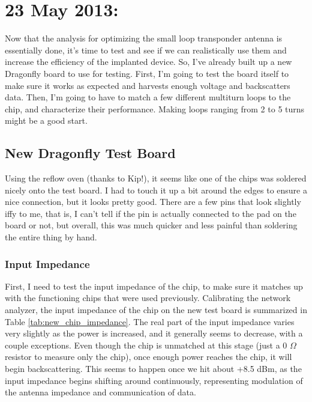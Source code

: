 \documentclass[12pt,onecolumn,titlepage]{article}
\begin{document}
\clearpage
\section{23 May 2013:}

\indent \indent Now that the analysis for optimizing the small loop transponder antenna is essentially done, it's time to test and see if we can realistically use them and increase the efficiency of the implanted device. So, I've already built up a new Dragonfly board to use for testing. First, I'm going to test the board itself to make sure it works as expected and harvests enough voltage and backscatters data. Then, I'm going to have to match a few different multiturn loops to the chip, and characterize their performance. Making loops ranging from 2 to 5 turns might be a good start.

\subsection{New Dragonfly Test Board}
\indent \indent Using the reflow oven (thanks to Kip!), it seems like one of the chips was soldered nicely onto the test board. I had to touch it up a bit around the edges to ensure a nice connection, but it looks pretty good. There are a few pins that look slightly iffy to me, that is, I can't tell if the pin is actually connected to the pad on the board or not, but overall, this was much quicker and less painful than soldering the entire thing by hand. 


\subsubsection{Input Impedance}
\indent \indent First, I need to test the input impedance of the chip, to make sure it matches up with the functioning chips that were used previously. Calibrating the network analyzer, the input impedance of the chip on the new test board is summarized in Table \ref{tab:new_chip_impedance}. The real part of the input impedance varies very slightly as the power is increased, and it generally seems to decrease, with a couple exceptions. Even though the chip is unmatched at this stage (just a 0 $\Omega$ resistor to measure only the chip), once enough power reaches the chip, it will begin backscattering. This seems to happen once we hit about +8.5 dBm, as the input impedance begins shifting around continuously, representing modulation of the antenna impedance and communication of data. 
\end{document}
